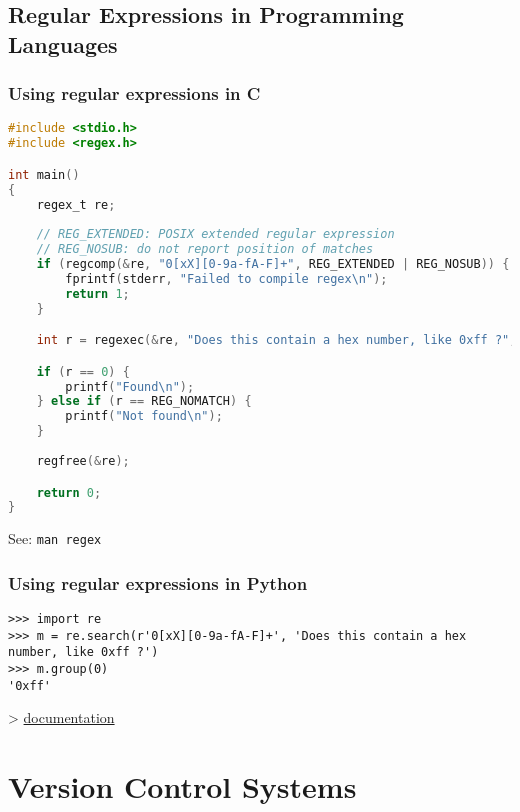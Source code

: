 \documentclass[12pt]{article}
\begin{document}
\subsection{Regular Expressions in Programming Languages}
\subsubsection{Using regular expressions in C}
\begin{lstlisting}[language=C]
#include <stdio.h>
#include <regex.h>

int main()
{
    regex_t re;
    
    // REG_EXTENDED: POSIX extended regular expression
    // REG_NOSUB: do not report position of matches
    if (regcomp(&re, "0[xX][0-9a-fA-F]+", REG_EXTENDED | REG_NOSUB)) {
        fprintf(stderr, "Failed to compile regex\n");
        return 1;
    }

    int r = regexec(&re, "Does this contain a hex number, like 0xff ?", 0, NULL, 0);

    if (r == 0) {
        printf("Found\n");
    } else if (r == REG_NOMATCH) {
        printf("Not found\n");
    }
    
    regfree(&re);

    return 0;
}
\end{lstlisting}
See: \texttt{man regex}

\subsubsection{Using regular expressions in Python}
\begin{lstlisting}
>>> import re
>>> m = re.search(r'0[xX][0-9a-fA-F]+', 'Does this contain a hex number, like 0xff ?')
>>> m.group(0)
'0xff'
\end{lstlisting}

\textgreater{} \href{https://docs.python.org/3/library/re.html}{documentation}






















\newpage
\section{Version Control Systems}
\end{document}
